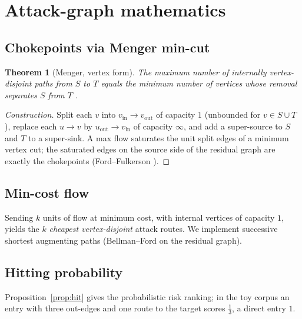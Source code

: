\documentclass[journal]{IEEEtran}
\newtheorem{theorem}{Theorem}
\begin{document}
\section{Attack-graph mathematics}
\label{sec:math}

\subsection{Chokepoints via Menger min-cut}
\begin{theorem}[Menger, vertex form]
\label{thm:menger}
The maximum number of internally vertex-disjoint paths from $S$ to $T$ equals the
minimum number of vertices whose removal separates $S$ from $T$ \cite{menger1927}.
\end{theorem}
\begin{proof}[Construction]
Split each $v$ into $v_{\mathrm{in}}\to v_{\mathrm{out}}$ of capacity $1$
(unbounded for $v\in S\cup T$), replace each $u\to v$ by
$u_{\mathrm{out}}\to v_{\mathrm{in}}$ of capacity $\infty$, and add a super-source
to $S$ and $T$ to a super-sink. A max flow saturates the unit split edges of a
minimum vertex cut; the saturated edges on the source side of the residual graph
are exactly the chokepoints (Ford--Fulkerson \cite{ford1956}). \qedhere
\end{proof}

\subsection{Min-cost flow}
Sending $k$ units of flow at minimum cost, with internal vertices of capacity $1$,
yields the $k$ \emph{cheapest vertex-disjoint} attack routes. We implement
successive shortest augmenting paths (Bellman--Ford on the residual graph).

\subsection{Hitting probability}
Proposition~\ref{prop:hit} gives the probabilistic risk ranking; in the toy corpus
an entry with three out-edges and one route to the target scores $\tfrac13$, a
direct entry $1$.
\end{document}
